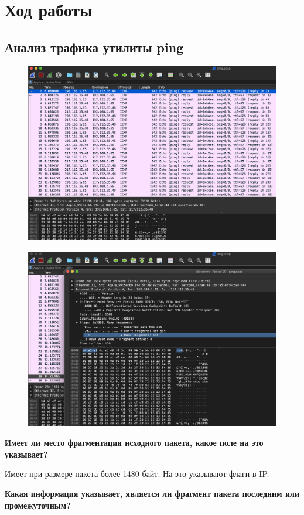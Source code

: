 \section{Ход работы}

\subsection{Анализ трафика утилиты ping}

\begin{figure}[H]
	\centering
	\includegraphics[width=0.7\linewidth]{"../Анализ трафика компьютерных сетей утилитой Wireshark/img/ping-1"}
	\caption{}
	\label{fig:ping-1}
\end{figure}

\begin{figure}[H]
	\centering
	\includegraphics[width=0.7\linewidth]{"../Анализ трафика компьютерных сетей утилитой Wireshark/img/ping-2"}
	\caption{}
	\label{fig:ping-2}
\end{figure}


\textbf{Имеет ли место фрагментация исходного пакета, какое поле на это указывает?}

Имеет при размере пакета более 1480 байт. На это указывают флаги в IP.

\textbf{Какая информация указывает, является ли фрагмент пакета последним или промежуточным?}

